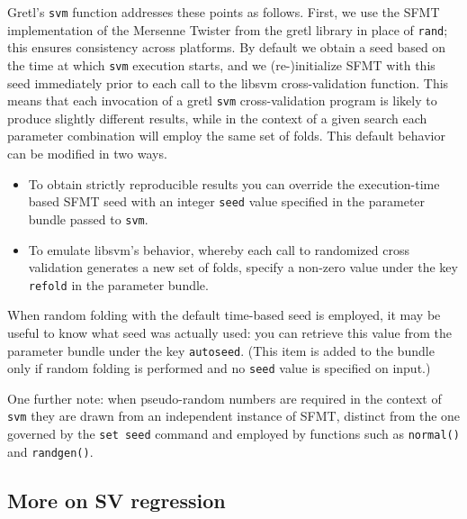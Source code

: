 \documentclass{article}
\begin{document}
Gretl's \texttt{svm} function addresses these points as
follows. First, we use the \textsf{SFMT} implementation of the
Mersenne Twister from the gretl library in place of \texttt{rand};
this ensures consistency across platforms. By default we obtain a seed
based on the time at which \texttt{svm} execution starts, and we
(re-)initialize \textsf{SFMT} with this seed immediately prior to each
call to the \textsf{libsvm} cross-validation function. This means that
each invocation of a gretl \texttt{svm} cross-validation program is
likely to produce slightly different results, while in the context of
a given search each parameter combination will employ the same set of
folds. This default behavior can be modified in two ways.
\begin{itemize}
\item To obtain strictly reproducible results you can override the
  execution-time based \textsf{SFMT} seed with an integer
  \texttt{seed} value specified in the parameter bundle passed to
  \texttt{svm}.
\item To emulate \textsf{libsvm}'s behavior, whereby each call to
  randomized cross validation generates a new set of folds, specify a
  non-zero value under the key \texttt{refold} in the parameter
  bundle.
\end{itemize}

When random folding with the default time-based seed is employed, it
may be useful to know what seed was actually used: you can retrieve
this value from the parameter bundle under the key
\texttt{autoseed}. (This item is added to the bundle only if random
folding is performed and no \texttt{seed} value is specified on
input.)

One further note: when pseudo-random numbers are required in the
context of \texttt{svm} they are drawn from an independent instance of
\textsf{SFMT}, distinct from the one governed by the \texttt{set seed}
command and employed by functions such as \texttt{normal()} and
\texttt{randgen()}.

\subsection{More on SV regression}
\label{sec:svr}
\end{document}
